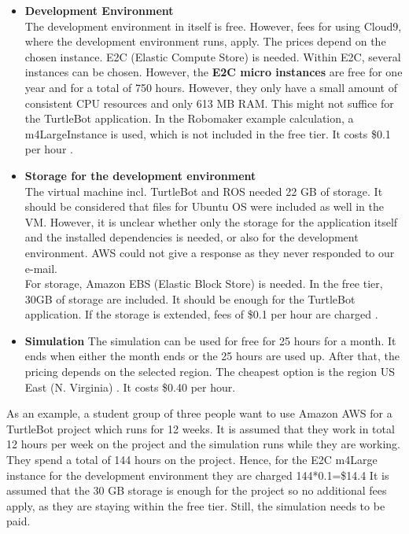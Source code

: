 \documentclass[plainarticle,zihtitle,english,final,hyperref,utf8]{zihpub}
\begin{document}
\begin{itemize}
    \item \textbf{Development Environment} \\
    The development environment in itself is free. However, fees for using Cloud9, where the development environment runs, apply. 
    The prices depend on the chosen instance. E2C (Elastic Compute Store) is needed. Within E2C, several instances can be chosen. However, the \textbf{E2C micro instances} are free for one year and for a total of 750 hours. However, they only have a small amount of consistent CPU resources and only 613 MB RAM. This might not suffice for the TurtleBot application. 
    In the Robomaker example calculation, a m4LargeInstance is used, which is not included in the free tier. It costs \$0.1 per hour \cite{awsprice}.
    \item \textbf{Storage for the development environment}\\
    The virtual machine incl. TurtleBot and ROS needed 22 GB of storage. It should be considered that files for Ubuntu OS were included as well in the VM. However, it is unclear whether only the storage for the application itself and the installed dependencies is needed, or also for the development environment. AWS could not give a response as they never responded to our e-mail.\\
    For storage, Amazon EBS (Elastic Block Store) is needed. In the free tier, 30GB of storage are included. It should be enough for the TurtleBot application. If the storage is extended, fees of \$0.1 per hour are charged \cite{awsebs}.
    \item \textbf{Simulation}
    The simulation can be used for free for 25 hours for a month. It ends when either the month ends or the 25 hours are used up. After that, the pricing depends on the selected region. The cheapest option is the region US East (N. Virginia) \cite{awsprice}. It costs \$0.40 per hour.
\end{itemize}
As an example, a student group of three people want to use Amazon AWS for a TurtleBot project which runs for 12 weeks. It is assumed that they work in total 12 hours per week on the project and the simulation runs while they are working. They spend a total of 144 hours on the project.
Hence, for the E2C m4Large instance for the development environment they are charged 144*0.1=\$14.4
It is assumed that the 30 GB storage is enough for the project so no additional fees apply, as they are staying within the free tier.
Still, the simulation needs to be paid.
\end{document}
